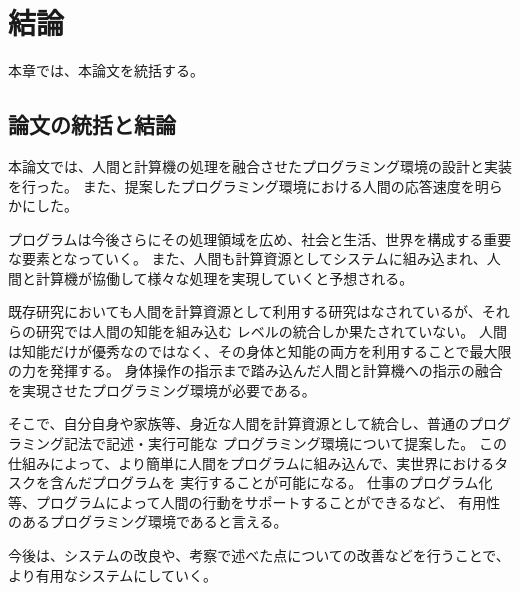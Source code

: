 \chapter{結論}\label{chap:conclusion}

本章では、本論文を統括する。

\section{論文の統括と結論}\label{ux8ad6ux6587ux306eux7d71ux62ecux3068ux7d50ux8ad6}

本論文では、人間と計算機の処理を融合させたプログラミング環境の設計と実装を行った。
また、提案したプログラミング環境における人間の応答速度を明らかにした。

プログラムは今後さらにその処理領域を広め、社会と生活、世界を構成する重要な要素となっていく。
また、人間も計算資源としてシステムに組み込まれ、人間と計算機が協働して様々な処理を実現していくと予想される。

既存研究においても人間を計算資源として利用する研究はなされているが、それらの研究では人間の知能を組み込む
レベルの統合しか果たされていない。
人間は知能だけが優秀なのではなく、その身体と知能の両方を利用することで最大限の力を発揮する。
身体操作の指示まで踏み込んだ人間と計算機への指示の融合を実現させたプログラミング環境が必要である。

そこで、自分自身や家族等、身近な人間を計算資源として統合し、普通のプログラミング記法で記述・実行可能な
プログラミング環境について提案した。
この仕組みによって、より簡単に人間をプログラムに組み込んで、実世界におけるタスクを含んだプログラムを
実行することが可能になる。
仕事のプログラム化等、プログラムによって人間の行動をサポートすることができるなど、
有用性のあるプログラミング環境であると言える。

今後は、システムの改良や、考察で述べた点についての改善などを行うことで、
より有用なシステムにしていく。
